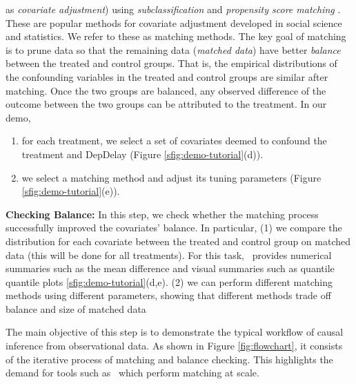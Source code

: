 as {\em covariate adjustment}) using {\em subclassification} and {\it propensity score matching} \cite{Rubin1983b,IacKinPor09,rosenbaum1984reducing}.
These are popular methods for covariate adjustment developed in social
science and statistics. We refer to these as matching methods.
The key goal of matching is to prune data so that
the remaining data ({\em matched data}) have better \emph{balance}
between the treated and control groups. That is, the empirical
distributions of the confounding variables in the treated and control
groups are similar after matching.
Once the two groups are balanced, any observed difference of the
outcome between the two groups can be attributed to the treatment. In
our demo,
\begin{enumerate}
  \item for each treatment, we select a set of covariates deemed to confound the treatment and DepDelay (Figure \ref{sfig:demo-tutorial}(d)).
  \item we select a matching method and adjust its tuning parameters (Figure \ref{sfig:demo-tutorial}(e)).
\end{enumerate}


{\bf Checking Balance:}  In this step, we check whether the
matching process  successfully improved the covariates' balance. In particular,
(1)  we compare the distribution for each covariate between the treated and control group on matched data (this will be done for all treatments). For this task, \GSQL\  provides numerical summaries such as the mean difference and visual summaries such as quantile quantile plots \ref{sfig:demo-tutorial}(d,e).
(2)  we can perform different matching methods using different
        parameters, showing that different methods trade off balance and size of matched data%

      The main objective of this step is to demonstrate the typical workflow of
       causal inference from observational data.
        As shown in Figure \ref{fig:flowchart}, it
        consists of the iterative process of matching and balance checking. This highlights the demand for tools such as \GSQL\, which perform matching at scale.

